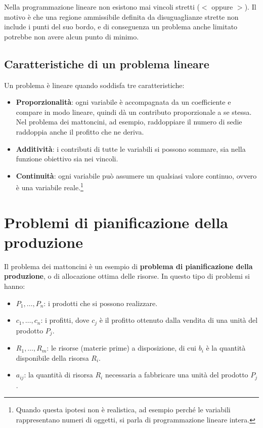 \begin{osservazione}
Nella programmazione lineare non esistono mai vincoli stretti ($<$ oppure $>$). Il motivo è che una regione ammissibile definita da disuguaglianze strette non include i punti del suo bordo, e di conseguenza un problema anche limitato potrebbe non avere alcun punto di minimo.
\end{osservazione}

\subsection{Caratteristiche di un problema lineare}
Un problema è lineare quando soddisfa tre caratteristiche:
\begin{itemize}
    \item \textbf{Proporzionalità}: ogni variabile è accompagnata da un coefficiente e compare in modo lineare, quindi dà un contributo proporzionale a se stessa. Nel problema dei mattoncini, ad esempio, raddoppiare il numero di sedie raddoppia anche il profitto che ne deriva.
    \item \textbf{Additività}: i contributi di tutte le variabili si possono sommare, sia nella funzione obiettivo sia nei vincoli.
    \item \textbf{Continuità}: ogni variabile può assumere un qualsiasi valore continuo, ovvero è una variabile reale.\footnote{Quando questa ipotesi non è realistica, ad esempio perché le variabili rappresentano numeri di oggetti, si parla di programmazione lineare intera.}
\end{itemize}

\section{Problemi di pianificazione della produzione}
Il problema dei mattoncini è un esempio di \textbf{problema di pianificazione della produzione}, o di allocazione ottima delle risorse. In questo tipo di problemi si hanno:
\begin{itemize}
    \item $P_1, \dots, P_n$: i prodotti che si possono realizzare.
    \item $c_1, \dots, c_n$: i profitti, dove $c_j$ è il profitto ottenuto dalla vendita di una unità del prodotto $P_j$.
    \item $R_1, \dots, R_m$: le risorse (materie prime) a disposizione, di cui $b_i$ è la quantità disponibile della risorsa $R_i$.
    \item $a_{ij}$: la quantità di risorsa $R_i$ necessaria a fabbricare una unità del prodotto $P_j$.
\end{itemize}

